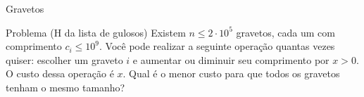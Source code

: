 \begin{frame}{Gravetos}

    \begin{block}{Problema (H da lista de gulosos)}
        Existem $n \leq 2\cdot10^5$ gravetos, cada um com comprimento $c_i \leq 10^9$. Você pode realizar a seguinte operação quantas vezes quiser: escolher um graveto $i$ e aumentar ou diminuir seu comprimento por $x > 0$. O custo dessa operação é $x$. Qual é o menor custo para que todos os gravetos tenham o mesmo tamanho?
    \end{block} \pause


    

\end{frame}

